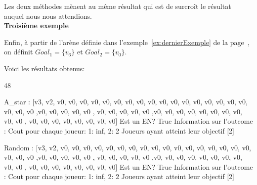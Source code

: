 Les deux méthodes mènent au même résultat qui est de surcroît le résultat auquel nous nous attendions. \\

\noindent \textbf{Troisième exemple}

Enfin, à partir de l'arène définie dans l'exemple~\ref{ex:dernierExemple} de la page~\pageref{ex:dernierExemple}, on définit $Goal_1 = \{ v_6 \}$ et $Goal_2 = \{ v_0 \}$.

\begin{figure}[ht!]
	\centering

\end{figure}

Voici les résultats obtenus:

\begin{code} 48

A_star : 
[v3, v2, v0, v0, v0, v0, v0, v0, v0, v0, v0,
v0, v0, v0, v0, v0, v0, v0, v0, v0, v0, v0 ,v0, v0,
v0, v0, v0 , v0, v0, v0, v0, v0 ,v0, v0, v0, v0, v0,
v0, v0, v0, v0, v0 , v0, v0, v0, v0, v0, v0, v0, v0]
Est un EN?  True
Information sur l'outcome : 
Cout pour chaque joueur:  {1: inf, 2: 2}
Joueurs ayant atteint leur objectif  [2]

Random :
[v3, v2, v0, v0, v0, v0, v0, v0, v0, v0, v0,
v0, v0, v0, v0, v0, v0, v0, v0, v0, v0, v0 ,v0, v0,
v0, v0, v0 , v0, v0, v0, v0, v0 ,v0, v0, v0, v0, v0,
v0, v0, v0, v0, v0 , v0, v0, v0, v0, v0, v0, v0, v0]
Est un EN?  True
Information sur l'outcome :
Cout pour chaque joueur:  {1: inf, 2: 2}
Joueurs ayant atteint leur objectif  [2]

\end{code}


